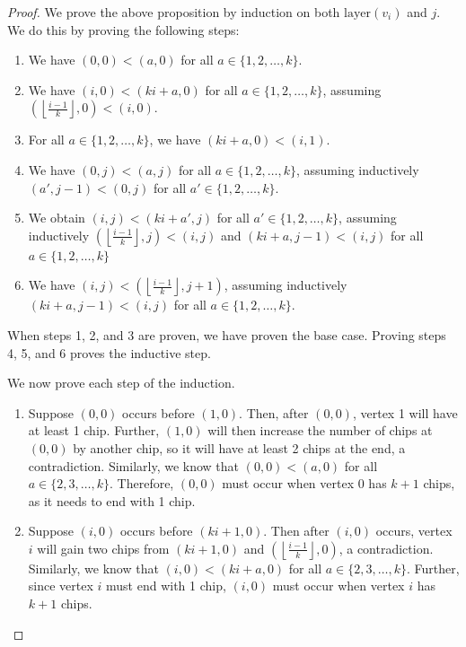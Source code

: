 \documentclass[11pt]{article}
\theoremstyle{remark}
\theoremstyle{definition}
\begin{document}
\begin{proof}
We prove the above proposition by induction on both $\mathrm{layer}(v_i)$ and $j$. We do this by proving the following steps:
\begin{enumerate}
    \item We have $(0,0) < (a, 0)$ for all $a \in \{1, 2, \dots, k\}$.
    \item We have $(i,0) < ({ki+a},0)$ for all $a \in \{1, 2, \dots, k\}$, assuming $\left ( \left \lfloor \frac {i-1} k \right \rfloor , 0 \right ) < (i,0)$.
    \item For all $a \in \{1, 2, \dots, k\}$, we have $(ki+a, 0) < (i,1)$.
    \item We have $(0,j) < (a, j)$ for all $a \in \{1, 2, \dots, k\}$, assuming inductively $(a',j-1)< (0,j)$ for all $a' \in \{1, 2, \dots, k\}$.
    \item We obtain $(i,j) < ({ki+a'}, j)$ for all $a' \in \{1,2,\dots, k\}$, assuming inductively $\left ( \left \lfloor \frac {i-1} k \right \rfloor , j \right ) < (i,j)$ and $(ki+a, j-1) < (i,j)$ for all $a \in \{1,2, \dots, k\}$
    \item We have $(i,j) < \left ({\left \lfloor \frac {i-1} k \right \rfloor}, j+1 \right)$, assuming inductively $({ki+a}, j-1) < (i,j)$ for all $a \in \{1,2, \dots, k\}$.
\end{enumerate}

When steps 1, 2, and 3 are proven, we have proven the base case. Proving steps 4, 5, and 6 proves the inductive step. 

We now prove each step of the induction.

\begin{enumerate}
    \item Suppose $(0,0)$ occurs before $(1,0)$. Then, after $(0,0)$, vertex 1 will have at least 1 chip. Further, $(1,0)$ will then increase the number of chips at $(0,0)$ by another chip, so it will have at least 2 chips at the end, a contradiction. Similarly, we know that $(0,0) < (a,0)$ for all $a \in \{2, 3, \dots, k\}$. Therefore, $(0,0)$ must occur when vertex 0 has $k+1$ chips, as it needs to end with 1 chip.

    \item Suppose $(i,0)$ occurs before $(ki+1, 0)$. Then after $(i,0)$ occurs, vertex $i$ will gain two chips from $(ki+1, 0)$ and $\left ( \left \lfloor \frac {i-1} k \right \rfloor, 0 \right )$, a contradiction. Similarly, we know that $(i,0) < (ki+a,0)$ for all $a \in \{2, 3, \dots, k\}$. Further, since vertex $i$ must end with 1 chip, $(i,0)$ must occur when vertex $i$ has $k+1$ chips.


\end{enumerate}
\end{proof}
\end{document}
